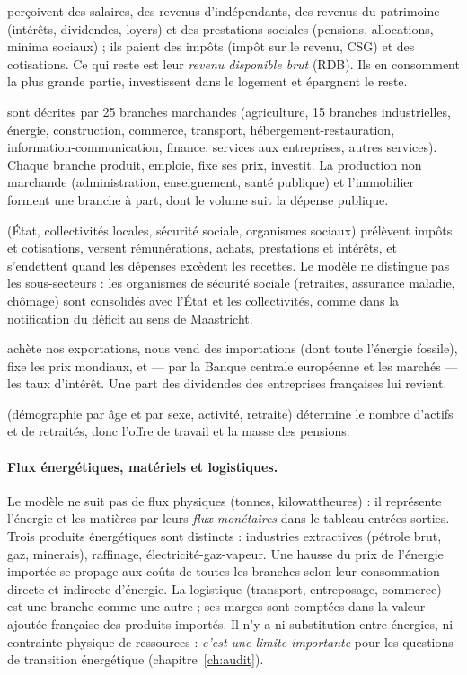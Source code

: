 \begin{description}[style=nextline,leftmargin=1.2em]
\item[Les ménages] perçoivent des salaires, des revenus d'indépendants, des revenus du patrimoine (intérêts,
dividendes, loyers) et des prestations sociales (pensions, allocations, minima sociaux) ; ils paient des impôts
(impôt sur le revenu, CSG) et des cotisations. Ce qui reste est leur \emph{revenu disponible brut} (RDB). Ils en
consomment la plus grande partie, investissent dans le logement et épargnent le reste.
\item[Les entreprises] sont décrites par 25 branches marchandes (agriculture, 15 branches industrielles, énergie,
construction, commerce, transport, hébergement-restauration, information-communication, finance, services aux
entreprises, autres services). Chaque branche produit, emploie, fixe ses prix, investit. La production non marchande
(administration, enseignement, santé publique) et l'immobilier forment une branche à part, dont le volume suit la
dépense publique.
\item[Les administrations publiques] (État, collectivités locales, sécurité sociale, organismes sociaux) prélèvent
impôts et cotisations, versent rémunérations, achats, prestations et intérêts, et s'endettent quand les dépenses
excèdent les recettes. Le modèle ne distingue pas les sous-secteurs : les organismes de sécurité sociale (retraites,
assurance maladie, chômage) sont consolidés avec l'État et les collectivités, comme dans la notification du déficit
au sens de Maastricht.
\item[Le reste du monde] achète nos exportations, nous vend des importations (dont toute l'énergie fossile), fixe les
prix mondiaux, et — par la Banque centrale européenne et les marchés — les taux d'intérêt. Une part des dividendes
des entreprises françaises lui revient.
\item[La population] (démographie par âge et par sexe, activité, retraite) détermine le nombre d'actifs et de
retraités, donc l'offre de travail et la masse des pensions.
\end{description}

\paragraph{Flux énergétiques, matériels et logistiques.}
Le modèle ne suit pas de flux physiques (tonnes, kilowattheures) : il représente l'énergie et les matières par leurs
\emph{flux monétaires} dans le tableau entrées-sorties. Trois produits énergétiques sont distincts : industries
extractives (pétrole brut, gaz, minerais), raffinage, électricité-gaz-vapeur. Une hausse du prix de l'énergie importée
se propage aux coûts de toutes les branches selon leur consommation directe et indirecte d'énergie. La logistique
(transport, entreposage, commerce) est une branche comme une autre ; ses marges sont comptées dans la valeur ajoutée
française des produits importés. Il n'y a ni substitution entre énergies, ni contrainte physique de ressources :
\emph{c'est une limite importante} pour les questions de transition énergétique (chapitre~\ref{ch:audit}).

